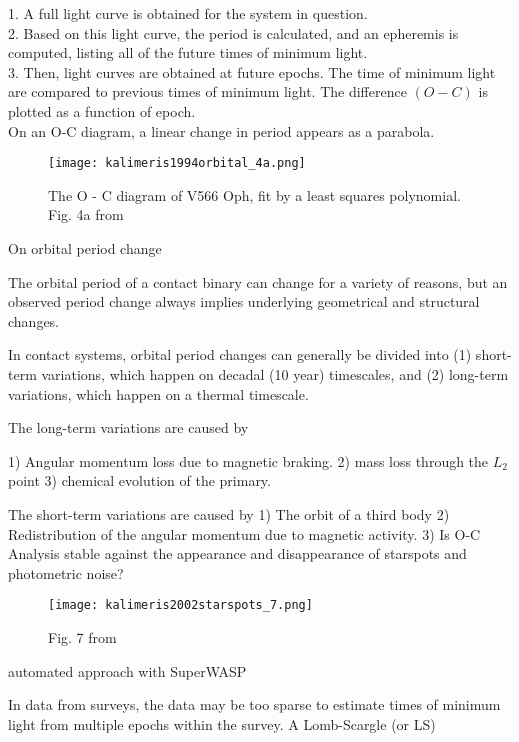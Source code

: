 \documentclass[12pt]{article} %
\numberwithin{equation}{section} %
\begin{document}
1. A full light curve is obtained for the system in question. \\
2. Based on this light curve, the period is calculated, and an epheremis is computed, listing all of the future times of minimum light. \\
3. Then, light curves are obtained at future epochs. The time of minimum light are compared to previous times of minimum light. The difference $(O-C)$ is plotted as a function of epoch. \\

On an O-C diagram, a linear change in period appears as a parabola.

\begin{figure}[H]
\centering
\texttt{[image: kalimeris1994orbital\_4a.png]}
\caption{ The O - C diagram of V566 Oph, fit by a least squares polynomial. Fig. 4a from \citet{kalimeris1994orbital}}
\label{fig: kalimeris1994orbital_4a}
\end{figure}

On orbital period change \citep{kalimeris1994orbital}

The orbital period of a contact binary can change for a variety of reasons, but an observed period change always implies underlying geometrical and structural changes.

In contact systems, orbital period changes can generally be divided into (1) short-term variations, which happen on decadal (10 year) timescales, and (2) long-term variations, which happen on a thermal timescale.

The long-term variations are caused by

1) Angular momentum loss due to magnetic braking.
2) mass loss through the $L_{2}$ point 
3) chemical evolution of the primary.

The short-term variations are caused by
1) The orbit of a third body
2) Redistribution of the angular momentum due to magnetic activity.
3) 
Is O-C Analysis stable against the appearance and disappearance of starspots and photometric noise? \citep{kalimeris2002starspots}

\begin{figure}[H]
\centering
\texttt{[image: kalimeris2002starspots\_7.png]}
\caption{ Fig. 7 from \citet{kalimeris2002starspots}}
\label{fig: kalimeris2002starspots_7}
\end{figure}

automated approach with SuperWASP \citep{lohr2015orbital}

In data from surveys, the data may be too sparse to estimate times of minimum light from multiple epochs within the survey. A Lomb-Scargle (or LS) \citep{scargle1982studies}
\end{document}
